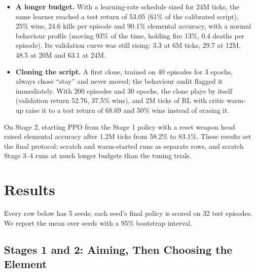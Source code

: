 \documentclass[11pt]{article}
\begin{document}
\begin{itemize}
    \item \textbf{A longer budget.} With a learning-rate schedule sized for 24M ticks, the same learner reached a test return of 53.05 (61\% of the calibrated script), 25\% wins, 24.6 kills per episode and 90.1\% elemental accuracy, with a normal behaviour profile (moving 93\% of the time, holding fire 13\%, 0.4 deaths per episode). Its validation curve was still rising: 3.3 at 6M ticks, 29.7 at 12M, 48.5 at 20M and 63.1 at 24M.
    \item \textbf{Cloning the script.} A first clone, trained on 40 episodes for 3 epochs, always chose ``stay'' and never moved; the behaviour audit flagged it immediately. With 200 episodes and 30 epochs, the clone plays by itself (validation return 52.76, 37.5\% wins), and 2M ticks of RL with critic warm-up raise it to a test return of 68.69 and 50\% wins instead of erasing it.
\end{itemize}

On Stage 2, starting PPO from the Stage 1 policy with a reset weapon head raised elemental accuracy after 1.2M ticks from 58.2\% to 83.1\%. These results set the final protocol: scratch and warm-started runs as separate rows, and scratch Stage 3--4 runs at much longer budgets than the tuning trials.

\section{Results}
\label{sec:results}

Every row below has 5 seeds; each seed's final policy is scored on 32 test episodes. We report the mean over seeds with a 95\% bootstrap interval.

\subsection{Stages 1 and 2: Aiming, Then Choosing the Element}
\end{document}
